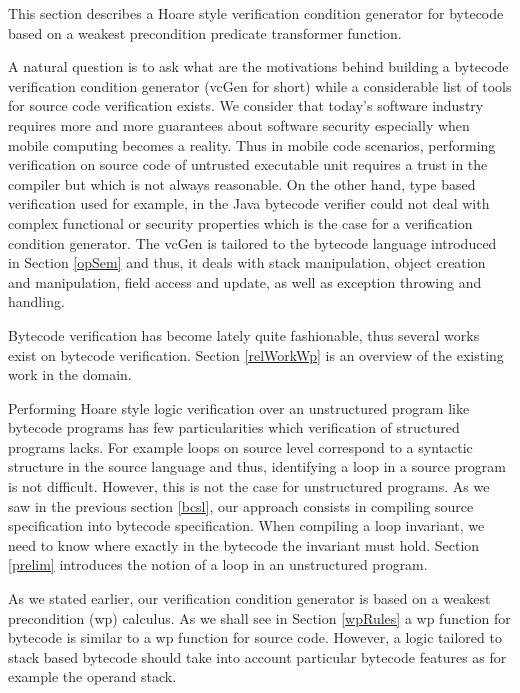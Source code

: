 
This section describes a Hoare style verification condition generator for bytecode based on a weakest precondition predicate transformer function.
 
A natural question is to ask what are the motivations behind building a bytecode verification condition generator (vcGen for short)
while a considerable list of tools for source code verification exists.
We consider that today's software industry requires more and more guarantees about software security especially when
mobile computing becomes a reality. Thus in mobile code scenarios, performing verification on source code of untrusted executable
 unit requires a trust in the compiler but which is not always reasonable. On the other hand,
 type based verification used for example, in the Java bytecode verifier could not deal with complex functional or security
 properties which is the case for a verification condition generator.   
The vcGen is tailored to the bytecode language introduced in Section \ref{opSem} and thus, it deals
with stack manipulation, object creation and manipulation, field access and update, as well as exception throwing and handling.

Bytecode verification has become lately quite fashionable, thus several works exist on bytecode verification. Section \ref{relWorkWp}
is an overview of the existing work in the domain.



Performing Hoare style logic verification over an unstructured program like bytecode programs has few particularities which
verification of structured programs lacks. For example loops on source level correspond to a syntactic structure in the source language and thus, identifying
a loop in a source program is not difficult.  However, this is not the case for unstructured programs. 
As we saw in the previous section \ref{bcsl}, our approach consists in compiling source specification into
bytecode specification. When compiling a loop invariant, we need to know where exactly in the bytecode the invariant must hold.
Section \ref{prelim} introduces the notion of a loop in an unstructured program.

As we stated earlier, our verification condition generator is based on a weakest precondition (wp) calculus. As we shall see in Section  \ref{wpRules}
a wp function for bytecode is similar to a wp function for source code. However, a logic tailored to stack based bytecode should take into account 
particular bytecode features as for example the operand stack.

 





 
